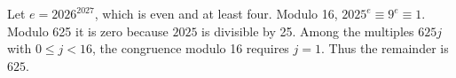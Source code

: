 Let $e=2026^{2027}$, which is even and at least four. Modulo 16, $2025^e\equiv9^e\equiv1$. Modulo 625 it is zero because $2025$ is divisible by 25. Among the multiples $625j$ with $0\le j<16$, the congruence modulo 16 requires $j=1$. Thus the remainder is $\boxed{625}$.
